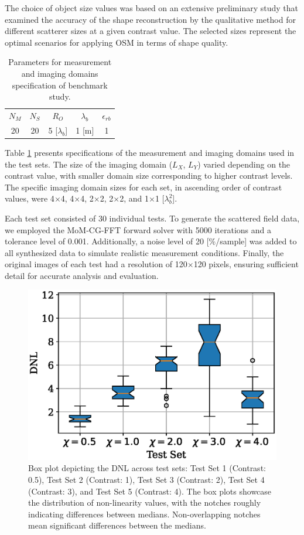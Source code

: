 			The choice of object size values was based on an extensive preliminary study that examined the accuracy of the shape reconstruction by the qualitative method for different scatterer sizes at a given contrast value. The selected sizes represent the optimal scenarios for applying OSM in terms of shape quality.
			
			\begin{table}[!h]
				\centering
				\caption[Parameters for benchmark study.]{Parameters for measurement and imaging domains specification of benchmark study.}
				\begin{tabular}{ccccc}
					$N_M$ & $N_S$ & $R_O$                & $\lambda_b$ & $\epsilon_{rb}$ \\
					20        & 20       & 5 [$\lambda_b$] & 1 [m]            &  1                      
				\end{tabular}
				\label{tab:results:benchmark:configuration}
			\end{table}
		
			Table \ref{tab:results:benchmark:configuration} presents specifications of the measurement and imaging domains used in the test sets. The size of the imaging domain ($L_X$, $L_Y$) varied depending on the contrast value, with smaller domain size corresponding to higher contrast levels. The specific imaging domain sizes for each set, in ascending order of contrast values, were 4$\times$4,  4$\times$4, 2$\times$2, 2$\times$2, and 1$\times$1 [$\lambda_b^2$].
			
			Each test set consisted of 30 individual tests. To generate the scattered field data, we employed the MoM-CG-FFT forward solver with 5000 iterations and a tolerance level of 0.001. Additionally, a noise level of 20 [\%/sample] was added to all synthesized data to simulate realistic measurement conditions. Finally, the original images of each test had a resolution of 120$\times$120 pixels, ensuring sufficient detail for accurate analysis and evaluation.
		
			\begin{figure}
				\centering
				\includegraphics[width=.5\textwidth]{./figuras/benchmark/dnl}
				\caption[Box plot depicting the Degree of Non-:inearity across test sets in benchmark study.]{Box plot depicting the DNL across test sets: Test Set 1 (Contrast: 0.5), Test Set 2 (Contrast: 1), Test Set 3 (Contrast: 2), Test Set 4 (Contrast: 3), and Test Set 5 (Contrast: 4). The box plots showcase the distribution of non-linearity values, with the notches roughly indicating differences between medians. Non-overlapping notches mean significant differences between the medians.}
				\label{fig:results:benchmark:dnl}
			\end{figure}
		
